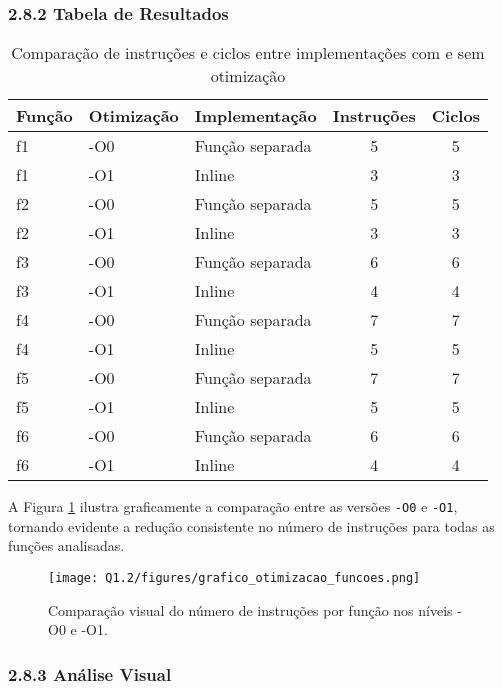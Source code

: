 \documentclass[12pt,a4paper]{article}
\begin{document}
\subsubsection*{2.8.2 Tabela de Resultados}
\begin{table}[h!]
    \centering
    \begin{tabular}{|l|l|l|c|c|}
        \hline
        \textbf{Função} & \textbf{Otimização} & \textbf{Implementação} & \textbf{Instruções} & \textbf{Ciclos} \\
        \hline
        f1 & -O0 & Função separada & 5 & 5 \\
        f1 & -O1 & Inline & 3 & 3 \\
        \hline
        f2 & -O0 & Função separada & 5 & 5 \\
        f2 & -O1 & Inline & 3 & 3 \\
        \hline
        f3 & -O0 & Função separada & 6 & 6 \\
        f3 & -O1 & Inline & 4 & 4 \\
        \hline
        f4 & -O0 & Função separada & 7 & 7 \\
        f4 & -O1 & Inline & 5 & 5 \\
        \hline
        f5 & -O0 & Função separada & 7 & 7 \\
        f5 & -O1 & Inline & 5 & 5 \\
        \hline
        f6 & -O0 & Função separada & 6 & 6 \\
        f6 & -O1 & Inline & 4 & 4 \\
        \hline
    \end{tabular}
    \caption{Comparação de instruções e ciclos entre implementações com e sem otimização}
\end{table}

A Figura \ref{fig:otimizacao_funcoes} ilustra graficamente a comparação entre as versões \texttt{-O0} e \texttt{-O1}, tornando evidente a redução consistente no número de instruções para todas as funções analisadas.

\begin{figure}[H]
\centering
\texttt{[image: Q1.2/figures/grafico\_otimizacao\_funcoes.png]}
\caption{Comparação visual do número de instruções por função nos níveis -O0 e -O1.}
\label{fig:otimizacao_funcoes}
\end{figure}

\subsubsection*{2.8.3 Análise Visual}
\end{document}

